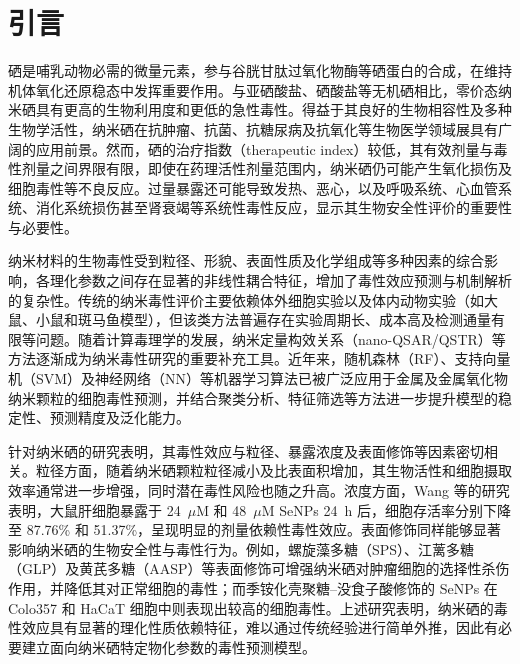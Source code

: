 \documentclass[letterpaper]{article}
\begin{document}
\section{引言}

硒是哺乳动物必需的微量元素，参与谷胱甘肽过氧化物酶等硒蛋白的合成，在维持机体氧化还原稳态中发挥重要作用。与亚硒酸盐、硒酸盐等无机硒相比，零价态纳米硒具有更高的生物利用度和更低的急性毒性。得益于其良好的生物相容性及多种生物学活性，纳米硒在抗肿瘤、抗菌、抗糖尿病及抗氧化等生物医学领域展具有广阔的应用前景\cite{hosnedlova2018nanoselenium,bisht2022senps,sowmya2024nanoselenium,karthik2024senps}。然而，硒的治疗指数（therapeutic index）较低，其有效剂量与毒性剂量之间界限有限，即使在药理活性剂量范围内，纳米硒仍可能产生氧化损伤及细胞毒性等不良反应\cite{wang2020prooxidation}。过量暴露还可能导致发热、恶心，以及呼吸系统、心血管系统、消化系统损伤甚至肾衰竭等系统性毒性反应\cite{hosnedlova2018nanoselenium}，显示其生物安全性评价的重要性与必要性。
 
纳米材料的生物毒性受到粒径、形貌、表面性质及化学组成等多种因素的综合影响，各理化参数之间存在显著的非线性耦合特征，增加了毒性效应预测与机制解析的复杂性\cite{ji2025rosml}。传统的纳米毒性评价主要依赖体外细胞实验以及体内动物实验（如大鼠、小鼠和斑马鱼模型），但该类方法普遍存在实验周期长、成本高及检测通量有限等问题\cite{ahmadi2024toxicity}。随着计算毒理学的发展，纳米定量构效关系（nano-QSAR/QSTR）等方法逐渐成为纳米毒性研究的重要补充工具\cite{roy2023tio2}。近年来，随机森林（RF）、支持向量机（SVM）及神经网络（NN）等机器学习算法已被广泛应用于金属及金属氧化物纳米颗粒的细胞毒性预测\cite{zhang2023qsar}，并结合聚类分析、特征筛选等方法进一步提升模型的稳定性、预测精度及泛化能力\cite{sang2022mlcytotoxicity}。
 
针对纳米硒的研究表明，其毒性效应与粒径、暴露浓度及表面修饰等因素密切相关。粒径方面，随着纳米硒颗粒粒径减小及比表面积增加，其生物活性和细胞摄取效率通常进一步增强，同时潜在毒性风险也随之升高\cite{zhang2023senpsbio}。浓度方面，Wang 等\cite{wang2020prooxidation}的研究表明，大鼠肝细胞暴露于 24~$\mu$M 和 48~$\mu$M SeNPs 24~h 后，细胞存活率分别下降至 87.76\% 和 51.37\%，呈现明显的剂量依赖性毒性效应。表面修饰同样能够显著影响纳米硒的生物安全性与毒性行为。例如，螺旋藻多糖（SPS）、江蓠多糖（GLP）及黄芪多糖（AASP）等表面修饰可增强纳米硒对肿瘤细胞的选择性杀伤作用，并降低其对正常细胞的毒性\cite{zhang2023senpsbio,ji2023astragalus}；而季铵化壳聚糖--没食子酸修饰的 SeNPs 在 Colo357 和 HaCaT 细胞中则表现出较高的细胞毒性\cite{lunkov2023chitosan}。上述研究表明，纳米硒的毒性效应具有显著的理化性质依赖特征，难以通过传统经验进行简单外推，因此有必要建立面向纳米硒特定物化参数的毒性预测模型。
 
\end{document}
